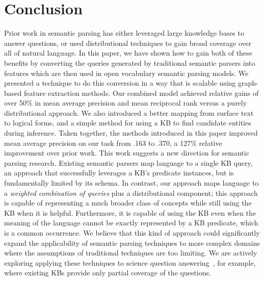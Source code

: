 \documentclass[11pt,letterpaper]{article}
\begin{document}
\section{Conclusion}
\label{sec:conclusion}

Prior work in semantic parsing has either leveraged large knowledge bases to answer questions, or
used distributional techniques to gain broad coverage over all of natural language.  In this paper,
we have shown how to gain both of these benefits by converting the queries generated by traditional
semantic parsers into features which are then used in open vocabulary semantic parsing models.  We
presented a technique to do this conversion in a way that is scalable using graph-based feature
extraction methods.  Our combined model achieved relative gains of over 50\% in mean average
precision and mean reciprocal rank versus a purely distributional approach.  We also introduced a
better mapping from surface text to logical forms, and a simple method for using a KB to find
candidate entities during inference.  Taken together, the methods introduced in this paper improved
mean average precision on our task from .163 to .370, a 127\% relative improvement over prior work.  This work suggests a new direction for semantic parsing research.  Existing semantic parsers map
language to a single KB query, an approach that successfully leverages a KB's predicate instances,
but is fundamentally limited by its schema. In contrast, our approach maps language to a
\emph{weighted combination of queries} plus a distributional component; this approach is capable of
representing a much broader class of concepts while still using the KB when it is helpful.
Furthermore, it is capable of using the KB even when the meaning of the language cannot be exactly
represented by a KB predicate, which is a common occurrence. We believe that this kind of approach
could significantly expand the applicability of semantic parsing techniques to more complex domains
where the assumptions of traditional techniques are too limiting.  We are actively exploring
applying these techniques to science question answering~\cite{clark-2013-kb-requirements-for-qa},
for example, where existing KBs provide only partial coverage of the questions.
\end{document}
